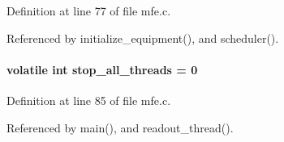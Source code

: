 Definition at line 77 of file mfe.c.

Referenced by initialize\_\-equipment(), and scheduler().
\paragraph[{stop\_\-all\_\-threads}]{\setlength{\rightskip}{0pt plus 5cm}volatile int {\bf stop\_\-all\_\-threads} = 0}\hfill\label{mfe_8c_ab8d6a79a86973098e87386a79dfc4bc7}


Definition at line 85 of file mfe.c.

Referenced by main(), and readout\_\-thread().